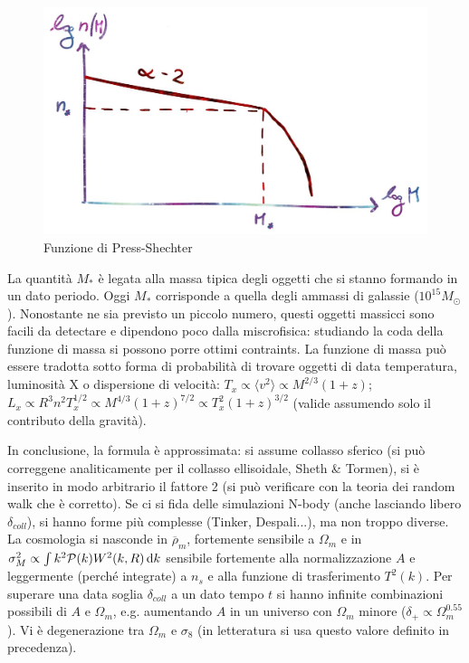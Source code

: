 \begin{figure}[H]
    \centering
    \includegraphics[width=.7 \textwidth]{Pictures/9/ps.jpg}
    \caption{Funzione di Press-Shechter}
\end{figure}

La quantità $M_*$ è legata alla massa tipica degli oggetti che si stanno formando in un dato periodo. Oggi $M_*$ corrisponde a quella degli ammassi di galassie ($10^{15}M_\odot$). Nonostante ne sia previsto un piccolo numero, questi oggetti massicci sono facili da detectare e dipendono poco dalla miscrofisica: studiando la coda della funzione di massa si possono porre ottimi contraints. La funzione di massa può essere tradotta sotto forma di probabilità di trovare oggetti di data temperatura, luminosità X o dispersione di velocità: $T_x\propto \langle v^2\rangle \propto M^{2/3}(1+z)$; $L_x \propto R^3 n^2 T_x^{1/2}\propto M^{4/3}(1+z)^{7/2}\propto T_x^2 (1+z)^{3/2}$ (valide assumendo solo il contributo della gravità).  

In conclusione, la formula è approssimata: si assume collasso sferico (si può correggene analiticamente per il collasso ellisoidale, Sheth \& Tormen), si è inserito in modo arbitrario il fattore 2 (si può verificare con la teoria dei random walk che è corretto). Se ci si fida delle simulazioni N-body (anche lasciando libero $\delta_{coll}$), si hanno forme più complesse (Tinker, Despali...), ma non troppo diverse. La cosmologia si nasconde in $\overbar{\rho}_m$, fortemente sensibile a $\Omega_m$ e in $\sigma_M^2\propto \int k^2 \mathcal{P}(k)W^2(k,R)\operatorname{d}\!{k}$ sensibile fortemente alla normalizzazione $A$ e leggermente (perché integrate) a $n_s$ e alla funzione di trasferimento $T^2(k)$. Per superare una data soglia $\delta_{coll}$ a un dato tempo $t$ si hanno infinite combinazioni possibili di $A$ e $\Omega_m$, e.g. aumentando $A$ in un universo con $\Omega_m$ minore ($\delta_+ \propto \Omega_m^{0.55}$). Vi è degenerazione tra $\Omega_m$ e $\sigma_8$ (in letteratura si usa questo valore definito in precedenza). 


